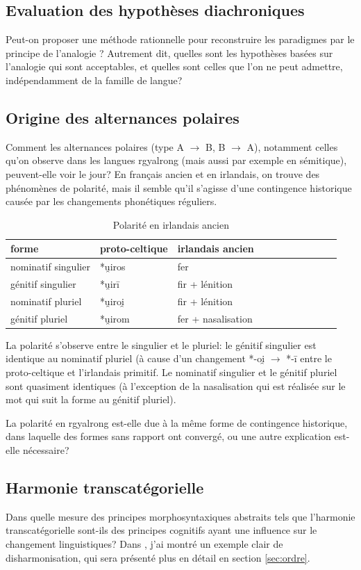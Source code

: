 \documentclass[oldfontcommands,oneside,a4paper,11pt]{memoir}
\begin{document}
\subsection{Evaluation des hypothèses diachroniques}
  Peut-on proposer une méthode rationnelle pour reconstruire les paradigmes par le principe de l'analogie ? Autrement dit, quelles sont les hypothèses basées sur l'analogie qui sont acceptables, et quelles sont celles que l'on ne peut admettre, indépendamment  de la famille de langue?
\subsection{Origine des alternances polaires}
  Comment les alternances polaires (type A $\rightarrow$ B, B $\rightarrow$ A), notamment celles qu'on observe dans les langues rgyalrong (mais aussi par exemple en sémitique), peuvent-elle voir le jour? En français ancien et en irlandais, on trouve des phénomènes de polarité, mais il semble qu'il s'agisse d'une contingence historique causée par les changements phonétiques réguliers. 
\begin{table}[H]
\caption{Polarité en irlandais ancien}  \centering
\begin{tabular}{lllllllllll}  \toprule  
forme & proto-celtique & irlandais ancien \\
\midrule
nominatif singulier & *u̯iros & fer \\
génitif singulier & *u̯irī & fir + lénition \\
nominatif pluriel & *u̯iroi̯ & fir + lénition \\
génitif pluriel & *u̯irom & fer + nasalisation \\
\bottomrule
\end{tabular}
\end{table}
La polarité s'observe entre le singulier et le pluriel: le génitif singulier est identique au nominatif pluriel (à cause d'un changement *-oi̯ $\rightarrow $ *-ī entre le proto-celtique et l'irlandais primitif. Le nominatif singulier et le génitif pluriel sont quasiment identiques (à l'exception de la nasalisation qui est réalisée sur le mot qui suit la forme au génitif pluriel). 

La polarité en rgyalrong est-elle due à la même forme de contingence historique, dans laquelle des formes sans rapport ont convergé, ou une autre explication est-elle nécessaire?
\subsection{Harmonie transcatégorielle}
  Dans quelle mesure des principes morphosyntaxiques abstraits tels que l'harmonie transcatégorielle sont-ils des principes cognitifs ayant une influence sur le changement linguistiques? Dans \citet{jacques13harmonization}, j'ai montré un exemple clair de disharmonisation, qui sera présenté plus en détail en section \ref{sec:ordre}.
 
\end{document}
